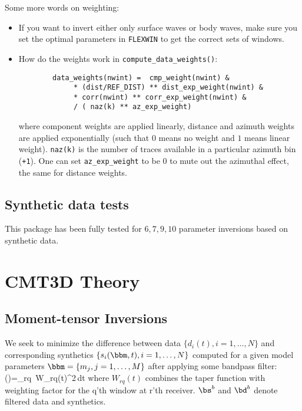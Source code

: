 \documentclass[12pt,titlepage,fleqn]{article}
\begin{document}
Some more words on weighting:
\begin{itemize}
\item If you want to invert either only surface waves or body waves, make sure you set the optimal parameters in \verb+FLEXWIN+ to get the correct sets of windows.

\item How do the weights work in \verb=compute_data_weights()=:
\begin{verbatim}
        data_weights(nwint) =  cmp_weight(nwint) &
             * (dist/REF_DIST) ** dist_exp_weight(nwint) &
             * corr(nwint) ** corr_exp_weight(nwint) &
             / ( naz(k) ** az_exp_weight)
\end{verbatim}
 where component weights are applied linearly, distance and azimuth weights are applied exponentially (such that $0$ means no weight and $1$ means linear weight). \verb=naz(k)= is the number of traces available in a particular azimuth bin (\verb=+1=). One can set \verb=az_exp_weight= to be 0 to mute out the azimuthal effect, the same for distance weights.

\end{itemize}

\subsection{Synthetic data tests}
This package has been fully tested for $6,7,9,10$ parameter inversions based on synthetic data.


\appendix
\section{CMT3D Theory}
\subsection{Moment-tensor Inversions}
We seek to minimize the difference between data $\{d_i(t),i=1,\ldots,N\}$ and corresponding synthetics $\{s_i(\bbm,t),i=1,\ldots,N\}$  computed for a given model parameters $\bbm=\{m_j,j=1,\ldots,M\}$ after applying some bandpass filter:
\eq
\phi(\bbm)=\oneovertwo \sum_{rq}  \int\,W_{rq}(t)^2\,dt
\en
where $W_{rq}(t)$ combines the taper function with weighting factor for the q'th window at r'th receiver. $\bs^b$ and $\bd^b$ denote filtered data and synthetics.
\end{document}
